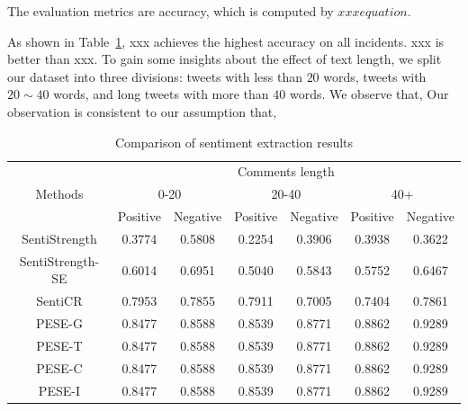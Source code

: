 \documentclass[runningheads]{llncs}
\begin{document}
The evaluation metrics are accuracy, which is computed by $xxx equation$. %

As shown in Table~\ref{table:sentiment classification}, xxx  achieves the highest accuracy on all incidents. %
xxx is better than xxx. %
To gain some insights about the effect of text length, we split our dataset into three divisions: tweets with less than $20$ words, tweets with $20\sim 40$ words, and long tweets with more than $40$ words.
We observe that, %
Our observation is consistent to our assumption that, %

\begin{table}[ht]
\caption{Comparison of sentiment extraction results}\label{table:sentiment classification}
\begin{center}
\begin{tabular}{|c|c|c|c|c|c|c|}
\hline
\multirow{3}{*}{Methods}             & \multicolumn{6}{c|}{Comments length}                                                \\ \cline{2-7} 
                                     & \multicolumn{2}{c|}{0-20} & \multicolumn{2}{c|}{20-40} & \multicolumn{2}{c|}{40+} \\ \cline{2-7} 
                                     & Positive    & Negative    & Positive     & Negative    & Positive     & Negative    \\ \hline
SentiStrength                        & 0.3774      & 0.5808      & 0.2254       & 0.3906      & 0.3938       & 0.3622      \\ \hline
SentiStrength-SE                     & 0.6014      & 0.6951      & 0.5040       & 0.5843      & 0.5752       & 0.6467      \\ \hline
SentiCR                              & 0.7953      & 0.7855      & 0.7911       & 0.7005      & 0.7404       & 0.7861      \\ \hline
 PESE-G                      & 0.8477      & 0.8588      & 0.8539       & 0.8771      & 0.8862       & 0.9289      \\ \hline
PESE-T                      & 0.8477      & 0.8588      & 0.8539       & 0.8771      & 0.8862       & 0.9289      \\ \hline
PESE-C                    & 0.8477      & 0.8588      & 0.8539       & 0.8771      & 0.8862       & 0.9289      \\ \hline
PESE-I                      & 0.8477      & 0.8588      & 0.8539       & 0.8771      & 0.8862       & 0.9289      \\ \hline
\end{tabular}
\end{center}
\end{table}
\end{document}
